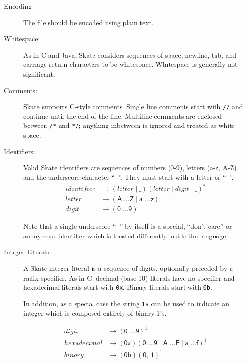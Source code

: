 \documentclass[a4paper,11pt,twoside]{report}
\begin{document}
{{\begin{description}
\item[Encoding] The file should be encoded using plain text.
\item[Whitespace:]  As in C and Java, Skate considers sequences of
  space, newline, tab, and carriage return characters to be
  whitespace.  Whitespace is generally not significant. 

\item[Comments:] Skate supports C-style comments.  Single line comments
  start with \texttt{//} and continue until the end of the line.
  Multiline comments are enclosed between \texttt{/*} and \texttt{*/};
  anything inbetween is ignored and treated as white space.

\item[Identifiers:] Valid Skate identifiers are sequences of numbers
  (0-9), letters (a-z, A-Z) and the underscore character ``\texttt{\_}''.  They
  must start with a letter or ``\texttt{\_}''.  
  \begin{align*}
    identifier & \rightarrow ( letter \mid \_ ) (letter \mid digit \mid \_)^{\textrm{*}} \\
    letter & \rightarrow (\textsf{A \ldots Z} \mid  \textsf{a \ldots z})\\
    digit & \rightarrow (\textsf{0 \ldots 9})
\end{align*}

  Note that a single underscore ``\texttt{\_}'' by itself is a special,
  ``don't care'' or anonymous identifier which is treated differently
  inside the language. 
  
\item[Integer Literals:] A Skate integer literal is a sequence of
  digits, optionally preceded by a radix specifier.  As in C, decimal (base 10)
  literals have no specifier and hexadecimal literals start with
  \texttt{0x}.  Binary literals start with \texttt{0b}. 

  In addition, as a special case the string \texttt{1s} can be used to
  indicate an integer which is composed entirely of binary 1's. 

\begin{align*}
digit & \rightarrow (\textsf{0 \ldots 9})^{\textrm{1}}\\
hexadecimal & \rightarrow (\textsf{0x})(\textsf{0 \ldots 9} \mid \textsf{A \ldots F} \mid \textsf{a \ldots f})^{\textrm{1}}\\
binary & \rightarrow (\textsf{0b})(\textsf{0, 1})^{\textrm{1}}\\
\end{align*}


\end{description}}}
\end{document}
